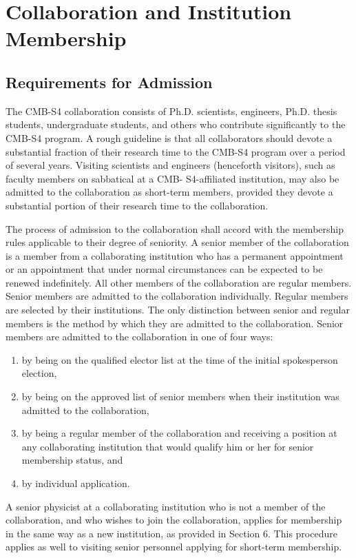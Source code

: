 \section{Collaboration and Institution Membership}

\subsection{Requirements for Admission}

The CMB-S4 collaboration consists of Ph.D. scientists, engineers, Ph.D. thesis students, undergraduate students, and others who contribute significantly to the CMB-S4 program. A rough guideline is that all collaborators should devote a substantial fraction of their research time to the CMB-S4 program over a period of several years.
Visiting scientists and engineers (henceforth visitors), such as faculty members on sabbatical at a CMB- S4-affiliated institution, may also be admitted to the collaboration as short-term members, provided they devote a substantial portion of their research time to the collaboration.

The process of admission to the collaboration shall accord with the membership rules applicable to their degree of seniority. A senior member of the collaboration is a member from a collaborating institution who has a permanent appointment or an appointment that under normal circumstances can be expected to be renewed indefinitely. All other members of the collaboration are regular members. Senior members are admitted to the collaboration individually. Regular members are selected by their institutions. The only distinction between senior and regular members is the method by which they are admitted to the collaboration.
Senior members are admitted to the collaboration in one of four ways:
\begin{enumerate}
\item by being on the qualified elector list at the time of the initial spokesperson election,
\item by being on the approved list of senior members when their institution was admitted to the collaboration,
\item by being a regular member of the collaboration and receiving a position at any collaborating institution that would qualify him or her for senior membership status,
and
\item by individual application.
\end{enumerate}
A senior physicist at a collaborating institution who is not a member of the collaboration, and who wishes to join the collaboration, applies for membership in the same way as a new institution, as provided in Section 6. This procedure applies as well to visiting senior personnel applying for short-term membership.

